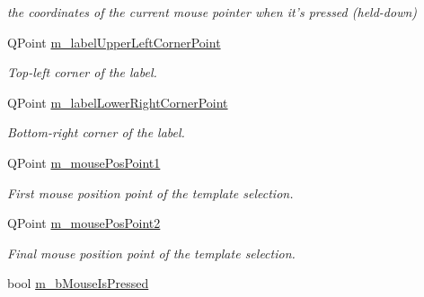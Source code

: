 \begin{CompactItemize}
\begin{CompactList}\small\item\em the coordinates of the current mouse pointer when it's pressed (held-down) \item\end{CompactList}\item 
\hypertarget{classImgLabel_5818aa44b47111a75d4f1d4b749f6ba1}{
QPoint \hyperlink{classImgLabel_5818aa44b47111a75d4f1d4b749f6ba1}{m\_\-labelUpperLeftCornerPoint}}
\label{classImgLabel_5818aa44b47111a75d4f1d4b749f6ba1}

\begin{CompactList}\small\item\em Top-left corner of the label. \item\end{CompactList}\item 
\hypertarget{classImgLabel_e9c219000c7ccb81a73f9784ba9df23b}{
QPoint \hyperlink{classImgLabel_e9c219000c7ccb81a73f9784ba9df23b}{m\_\-labelLowerRightCornerPoint}}
\label{classImgLabel_e9c219000c7ccb81a73f9784ba9df23b}

\begin{CompactList}\small\item\em Bottom-right corner of the label. \item\end{CompactList}\item 
\hypertarget{classImgLabel_d58eb83a86663876080a2e24ad016b39}{
QPoint \hyperlink{classImgLabel_d58eb83a86663876080a2e24ad016b39}{m\_\-mousePosPoint1}}
\label{classImgLabel_d58eb83a86663876080a2e24ad016b39}

\begin{CompactList}\small\item\em First mouse position point of the template selection. \item\end{CompactList}\item 
\hypertarget{classImgLabel_5d8c18646dda1aaf5c574ed88b63b0ee}{
QPoint \hyperlink{classImgLabel_5d8c18646dda1aaf5c574ed88b63b0ee}{m\_\-mousePosPoint2}}
\label{classImgLabel_5d8c18646dda1aaf5c574ed88b63b0ee}

\begin{CompactList}\small\item\em Final mouse position point of the template selection. \item\end{CompactList}\item 
\hypertarget{classImgLabel_b7550fba92f0346edd4a61c1a84eee4d}{
bool \hyperlink{classImgLabel_b7550fba92f0346edd4a61c1a84eee4d}{m\_\-bMouseIsPressed}}
\label{classImgLabel_b7550fba92f0346edd4a61c1a84eee4d}


\end{CompactItemize}

